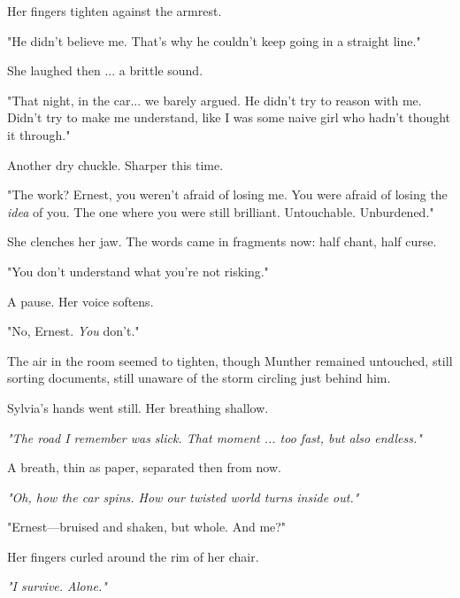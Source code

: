 Her fingers tighten against the armrest.

\bigskip

"He didn’t believe me. That’s why he couldn’t keep going in a straight line."

\bigskip

She laughed then ... a brittle sound.

\bigskip

"That night, in the car... we barely argued. He didn’t try to reason with me. Didn’t try to make me understand, like I was some naive girl who hadn’t thought it through."

\bigskip

Another dry chuckle. Sharper this time.

\bigskip

"The work? Ernest, you weren’t afraid of losing me. You were afraid of losing the \textit{idea} of you. The one where you were still brilliant. Untouchable. Unburdened."

\bigskip

She clenches her jaw. The words came in fragments now: half chant, half curse.

\bigskip

"You don’t understand what you’re not risking."

\bigskip

A pause. Her voice softens.

\bigskip

"No, Ernest. \textit{You} don’t."

\bigskip

The air in the room seemed to tighten, though Munther remained untouched, still sorting documents, still unaware of the storm circling just behind him.

\bigskip

Sylvia’s hands went still. Her breathing shallow.

\textit{"The road I remember was slick. That moment ... too fast, but also endless."}

A breath, thin as paper, separated then from now.

\textit{"Oh, how the car spins. How our twisted world turns inside out."}

\bigskip

"Ernest—bruised and shaken, but whole. And me?"

Her fingers curled around the rim of her chair.

\textit{"I survive. Alone."}

